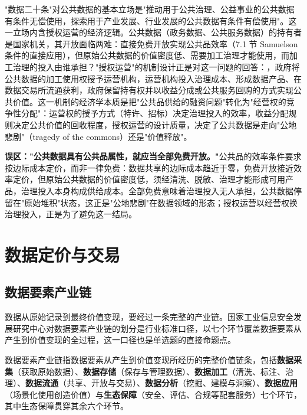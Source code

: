 "数据二十条"对公共数据的基本立场是"推动用于公共治理、公益事业的公共数据有条件无偿使用，探索用于产业发展、行业发展的公共数据有条件有偿使用"。这一立场内含授权运营的经济逻辑。公共数据（政务数据、公共服务数据）的持有者是国家机关，其开放面临两难：直接免费开放实现公共品效率（7.1 节 Samuelson 条件的直接应用），但原始公共数据的价值密度低、需要加工治理才能使用，而加工治理的投入由谁承担？"授权运营"的机制设计正是对这一问题的回答：，政府将公共数据的加工使用权授予运营机构，运营机构投入治理成本、形成数据产品、在数据交易所流通获利，政府保留持有权并以收益分成或公共服务回购的方式实现公共价值。这一机制的经济学本质是把"公共品供给的融资问题"转化为"经营权的竞争性分配"：运营权的授予方式（特许、招标）决定治理投入的效率，收益分配规则决定公共价值的回收程度，授权运营的设计质量，决定了公共数据是走向"公地悲剧"（tragedy of the commons）还是"价值释放"。

\begin{misconception}
\textbf{误区："公共数据具有公共品属性，就应当全部免费开放。"}公共品的效率条件要求按边际成本定价，而非一律免费：数据共享的边际成本趋近于零，免费开放接近效率定价，但原始公共数据的价值密度低，须经清洗、脱敏、治理才能形成可用产品，治理投入本身构成供给成本。全部免费意味着治理投入无人承担，公共数据停留在"原始堆积"状态，这正是"公地悲剧"在数据领域的形态；授权运营以经营权换治理投入，正是为了避免这一结局。
\end{misconception}

\section{数据定价与交易}

\subsection{数据要素产业链}

数据从原始记录到最终价值变现，要经过一条完整的产业链。国家工业信息安全发展研究中心对数据要素产业链的划分是行业标准口径，以七个环节覆盖数据要素从产生到价值变现的全过程，这一口径也是单选题的直接命题点。

\begin{definition}
数据要素产业链指数据要素从产生到价值变现所经历的完整价值链条，包括\textbf{数据采集}（获取原始数据）、\textbf{数据存储}（保存与管理数据）、\textbf{数据加工}（清洗、标注、治理）、\textbf{数据流通}（共享、开放与交易）、\textbf{数据分析}（挖掘、建模与洞察）、\textbf{数据应用}（场景化使用创造价值）与\textbf{生态保障}（安全、评估、合规等配套服务）七个环节，其中生态保障贯穿其余六个环节。
\end{definition}

